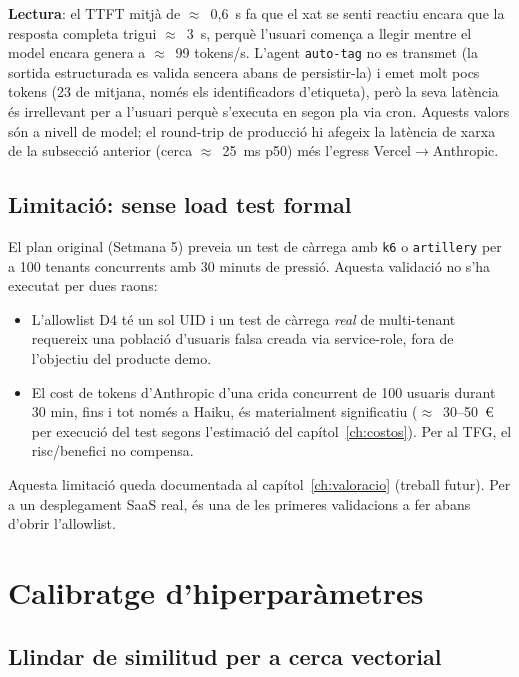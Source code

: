 \textbf{Lectura}: el TTFT mitjà de $\approx$~0,6~s fa que el xat se senti reactiu encara que la resposta completa trigui $\approx$~3~s, perquè l'usuari comença a llegir mentre el model encara genera a $\approx$~99 tokens/s. L'agent \texttt{auto-tag} no es transmet (la sortida estructurada es valida sencera abans de persistir-la) i emet molt pocs tokens (23 de mitjana, només els identificadors d'etiqueta), però la seva latència és irrellevant per a l'usuari perquè s'executa en segon pla via cron. Aquests valors són a nivell de model; el round-trip de producció hi afegeix la latència de xarxa de la subsecció anterior (cerca $\approx$~25~ms p50) més l'egress Vercel$\rightarrow$Anthropic.

\subsection{Limitació: sense load test formal}

El plan original (Setmana 5) preveia un test de càrrega amb \texttt{k6} o \texttt{artillery} per a 100 tenants concurrents amb 30 minuts de pressió. Aquesta validació no s'ha executat per dues raons:

\begin{itemize}
    \item L'allowlist D4 té un sol UID i un test de càrrega \emph{real} de multi-tenant requereix una població d'usuaris falsa creada via service-role, fora de l'objectiu del producte demo.
    \item El cost de tokens d'Anthropic d'una crida concurrent de 100 usuaris durant 30 min, fins i tot només a Haiku, és materialment significatiu ($\approx$~30--50~\euro{} per execució del test segons l'estimació del capítol~\ref{ch:costos}). Per al TFG, el risc/benefici no compensa.
\end{itemize}

Aquesta limitació queda documentada al capítol~\ref{ch:valoracio} (treball futur). Per a un desplegament SaaS real, és una de les primeres validacions a fer abans d'obrir l'allowlist.

\section{Calibratge d'hiperparàmetres}
\label{sec:calibratge}

\subsection{Llindar de similitud per a cerca vectorial}
\label{sec:calibratge-rag}


